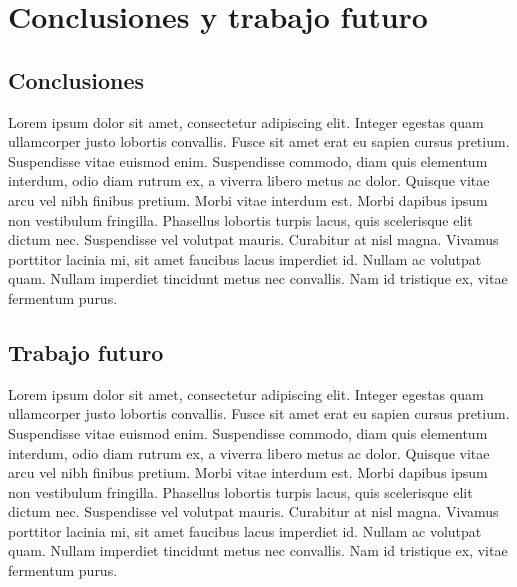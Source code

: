 
\chapter{Conclusiones y trabajo futuro}\label{ch:conclusiones}

\section{Conclusiones}

Lorem ipsum dolor sit amet, consectetur adipiscing elit. Integer egestas quam ullamcorper justo lobortis convallis. Fusce sit amet erat eu sapien cursus pretium. Suspendisse vitae euismod enim. Suspendisse commodo, diam quis elementum interdum, odio diam rutrum ex, a viverra libero metus ac dolor. Quisque vitae arcu vel nibh finibus pretium. Morbi vitae interdum est. Morbi dapibus ipsum non vestibulum fringilla. Phasellus lobortis turpis lacus, quis scelerisque elit dictum nec. Suspendisse vel volutpat mauris. Curabitur at nisl magna. Vivamus porttitor lacinia mi, sit amet faucibus lacus imperdiet id. Nullam ac volutpat quam. Nullam imperdiet tincidunt metus nec convallis. Nam id tristique ex, vitae fermentum purus.

\section{Trabajo futuro}

Lorem ipsum dolor sit amet, consectetur adipiscing elit. Integer egestas quam ullamcorper justo lobortis convallis. Fusce sit amet erat eu sapien cursus pretium. Suspendisse vitae euismod enim. Suspendisse commodo, diam quis elementum interdum, odio diam rutrum ex, a viverra libero metus ac dolor. Quisque vitae arcu vel nibh finibus pretium. Morbi vitae interdum est. Morbi dapibus ipsum non vestibulum fringilla. Phasellus lobortis turpis lacus, quis scelerisque elit dictum nec. Suspendisse vel volutpat mauris. Curabitur at nisl magna. Vivamus porttitor lacinia mi, sit amet faucibus lacus imperdiet id. Nullam ac volutpat quam. Nullam imperdiet tincidunt metus nec convallis. Nam id tristique ex, vitae fermentum purus.
